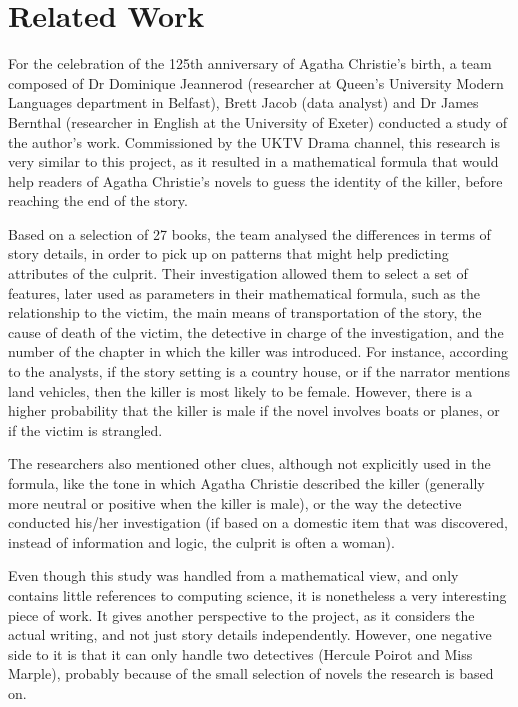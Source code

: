 \documentclass{mproj}
\begin{document}
\section{Related Work}

For the celebration of the 125th anniversary of Agatha Christie's birth, a team composed of Dr Dominique Jeannerod (researcher at Queen's University Modern Languages department in Belfast), Brett Jacob (data analyst) and Dr James Bernthal (researcher in English at the University of Exeter) conducted a study of the author's work. \cite{whodunnitbelfast} \cite{whodunnitguardian}
Commissioned by the UKTV Drama channel, this research is very similar to this project, as it resulted in a mathematical formula that would help readers of Agatha Christie's novels to guess the identity of the killer, before reaching the end of the story. \par

Based on a selection of 27 books, the team analysed the differences in terms of story details, in order to pick up on patterns that might help predicting attributes of the culprit. Their investigation allowed them to select a set of features, later used as parameters in their mathematical formula, such as the relationship to the victim, the main means of transportation of the story, the cause of death of the victim, the detective in charge of the investigation, and the number of the chapter in which the killer was introduced. For instance, according to the analysts, if the story setting is a country house, or if the narrator mentions land vehicles, then the killer is most likely to be female. However, there is a higher probability that the killer is male if the novel involves boats or planes, or if the victim is strangled. \par

The researchers also mentioned other clues, although not explicitly used in the formula, like the tone in which Agatha Christie described the killer (generally more neutral or positive when the killer is male), or the way the detective conducted his/her investigation (if based on a domestic item that was discovered, instead of information and logic, the culprit is often a woman).  \par

Even though this study was handled from a mathematical view, and only contains little references to computing science, it is nonetheless a very interesting piece of work. It gives another perspective to the project, as it considers the actual writing, and not just story details independently. However, one negative side to it is that it can only handle two detectives (Hercule Poirot and Miss Marple), probably because of the small selection of novels the research is based on.
\end{document}
